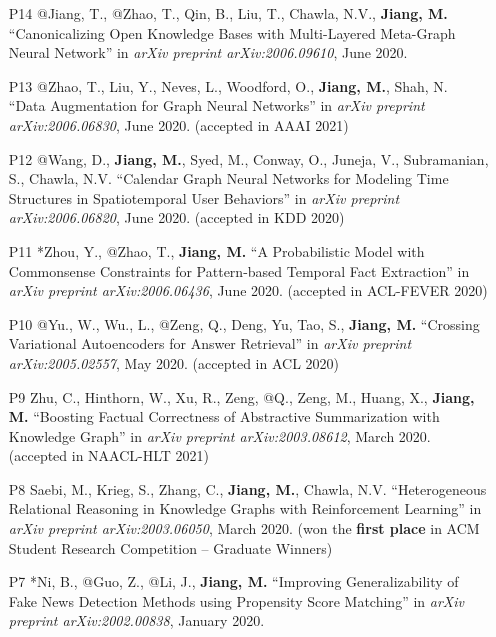 \documentclass[10pt]{article}
\newenvironment{myindentpar}[1]%
{\begin{list}{}%
         {\setlength{\leftmargin}{#1}}%
         \item[]%
}
{\end{list}}
\newcounter{list}
\begin{document}
\begin{myindentpar}{0.00cm}
{\begin{enumerate}[leftmargin=.5cm]
\item[P14] @Jiang, T., @Zhao, T., Qin, B., Liu, T., Chawla, N.V., \textbf{Jiang, M.} ``Canonicalizing Open Knowledge Bases with Multi-Layered Meta-Graph Neural Network'' in \textit{arXiv preprint arXiv:2006.09610}, June 2020.
		
\item[P13] @Zhao, T., Liu, Y., Neves, L., Woodford, O., \textbf{Jiang, M.}, Shah, N. ``Data Augmentation for Graph Neural Networks'' in \textit{arXiv preprint arXiv:2006.06830}, June 2020. (accepted in AAAI 2021)

\item[P12] @Wang, D., \textbf{Jiang, M.}, Syed, M., Conway, O., Juneja, V., Subramanian, S., Chawla, N.V. ``Calendar Graph Neural Networks for Modeling Time Structures in Spatiotemporal User Behaviors'' in \textit{arXiv preprint arXiv:2006.06820}, June 2020. (accepted in KDD 2020)
		
\item[P11] *Zhou, Y., @Zhao, T., \textbf{Jiang, M.} ``A Probabilistic Model with Commonsense Constraints for Pattern-based Temporal Fact Extraction'' in \textit{arXiv preprint arXiv:2006.06436}, June 2020. (accepted in ACL-FEVER 2020)

\item[P10] @Yu., W., Wu., L., @Zeng, Q., Deng, Yu, Tao, S., \textbf{Jiang, M.} ``Crossing Variational Autoencoders for Answer Retrieval'' in \textit{arXiv preprint arXiv:2005.02557}, May 2020. (accepted in ACL 2020)
		
\item[P9] Zhu, C., Hinthorn, W., Xu, R., Zeng, @Q., Zeng, M., Huang, X., \textbf{Jiang, M.} ``Boosting Factual Correctness of Abstractive Summarization with Knowledge Graph'' in \textit{arXiv preprint arXiv:2003.08612}, March 2020. (accepted in NAACL-HLT 2021)

\item[P8] Saebi, M., Krieg, S., Zhang, C., \textbf{Jiang, M.}, Chawla, N.V. ``Heterogeneous Relational Reasoning in Knowledge Graphs with Reinforcement Learning'' in \textit{arXiv preprint arXiv:2003.06050}, March 2020. (won the \textbf{first place} in ACM Student Research Competition -- Graduate Winners)

\item[P7] *Ni, B., @Guo, Z., @Li, J., \textbf{Jiang, M.} ``Improving Generalizability of Fake News Detection Methods using Propensity Score Matching'' in \textit{arXiv preprint arXiv:2002.00838}, January 2020.
		

\end{enumerate}}
\end{myindentpar}
\end{document}
